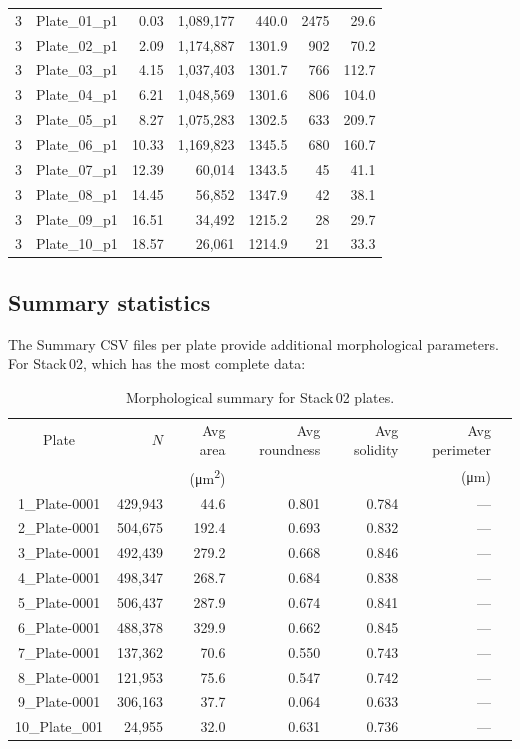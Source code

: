 \documentclass[12pt,a4paper]{article}
\begin{document}
\begin{table}[H]
\begin{tabular}{crrrrrr}
3 & Plate\_01\_p1 & 0.03 & 1,089,177 & 440.0 & 2475 & 29.6 \\
3 & Plate\_02\_p1 & 2.09 & 1,174,887 & 1301.9 & 902 & 70.2 \\
3 & Plate\_03\_p1 & 4.15 & 1,037,403 & 1301.7 & 766 & 112.7 \\
3 & Plate\_04\_p1 & 6.21 & 1,048,569 & 1301.6 & 806 & 104.0 \\
3 & Plate\_05\_p1 & 8.27 & 1,075,283 & 1302.5 & 633 & 209.7 \\
3 & Plate\_06\_p1 & 10.33 & 1,169,823 & 1345.5 & 680 & 160.7 \\
3 & Plate\_07\_p1 & 12.39 & 60,014 & 1343.5 & 45 & 41.1 \\
3 & Plate\_08\_p1 & 14.45 & 56,852 & 1347.9 & 42 & 38.1 \\
3 & Plate\_09\_p1 & 16.51 & 34,492 & 1215.2 & 28 & 29.7 \\
3 & Plate\_10\_p1 & 18.57 & 26,061 & 1214.9 & 21 & 33.3 \\
\bottomrule
\end{tabular}
\end{table}

\subsection{Summary statistics}

The Summary CSV files per plate provide additional morphological
parameters. For Stack\,02, which has the most complete data:

\begin{table}[H]
\centering
\caption{Morphological summary for Stack\,02 plates.}
\label{tab:morph}
\begin{tabular}{crrrrrc}
\toprule
Plate & $N$ & Avg area & Avg roundness & Avg solidity &
Avg perimeter \\
 & & (\si{\micro\meter\squared}) & & & (\si{\micro\meter}) \\
\midrule
1\_Plate-0001 & 429,943 & 44.6 & 0.801 & 0.784 & --- \\
2\_Plate-0001 & 504,675 & 192.4 & 0.693 & 0.832 & --- \\
3\_Plate-0001 & 492,439 & 279.2 & 0.668 & 0.846 & --- \\
4\_Plate-0001 & 498,347 & 268.7 & 0.684 & 0.838 & --- \\
5\_Plate-0001 & 506,437 & 287.9 & 0.674 & 0.841 & --- \\
6\_Plate-0001 & 488,378 & 329.9 & 0.662 & 0.845 & --- \\
7\_Plate-0001 & 137,362 & 70.6 & 0.550 & 0.743 & --- \\
8\_Plate-0001 & 121,953 & 75.6 & 0.547 & 0.742 & --- \\
9\_Plate-0001 & 306,163 & 37.7 & 0.064 & 0.633 & --- \\
10\_Plate\_001 & 24,955 & 32.0 & 0.631 & 0.736 & --- \\
\bottomrule
\end{tabular}
\end{table}
\end{document}
